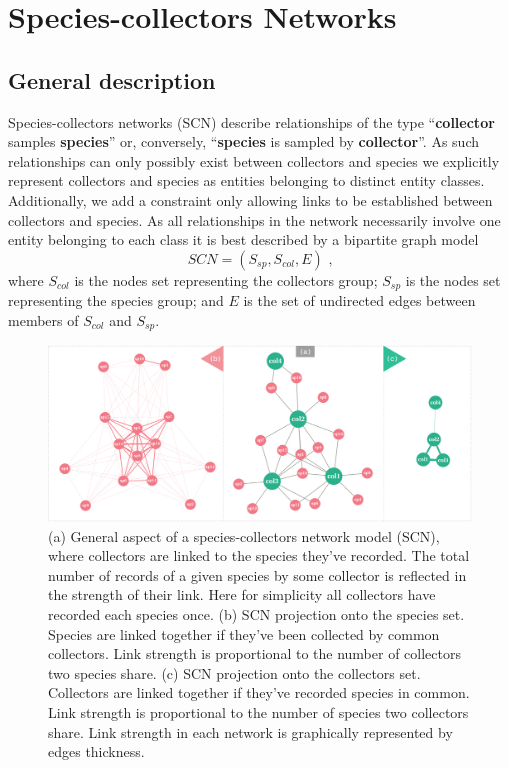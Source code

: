 \section{Species-collectors Networks}



\subsection{General description}

Species-collectors networks (SCN) describe relationships of the type ``\textbf{collector} samples \textbf{species}'' or, conversely, ``\textbf{species} is sampled by \textbf{collector}''. 
As such relationships can only possibly exist between collectors and species we explicitly represent collectors and species as entities belonging to distinct entity classes. Additionally, we add a constraint only allowing links to be established between collectors and species.
As all relationships in the network necessarily involve one entity belonging to each class it is best described by a bipartite graph model
$$ SCN = (S_{sp},S_{col},E) \mbox{ ,}$$
where $S_{col}$ is the nodes set representing the collectors group; $S_{sp}$ is the nodes set representing the species group; and $E$ is the set of undirected edges between members of $S_{col}$ and $S_{sp}$.

  \begin{figure}[h!]
  	\centering
    \includegraphics[width=\linewidth]{figures/scn_generalaspect.png}
    \caption{(a) General aspect of a species-collectors network model (SCN), where collectors are linked to the species they've recorded. The total number of records of a given species by some collector is reflected in the strength of their link. Here for simplicity all collectors have recorded each species once. (b) SCN projection onto the species set. Species are linked together if they've been collected by common collectors. Link strength is proportional to the number of collectors two species share. (c) SCN projection onto the collectors set. Collectors are linked together if they've recorded species in common. Link strength is proportional to the number of species two collectors share. Link strength in each network is graphically represented by edges thickness.}
    \label{fig:scn_general}
  \end{figure}

